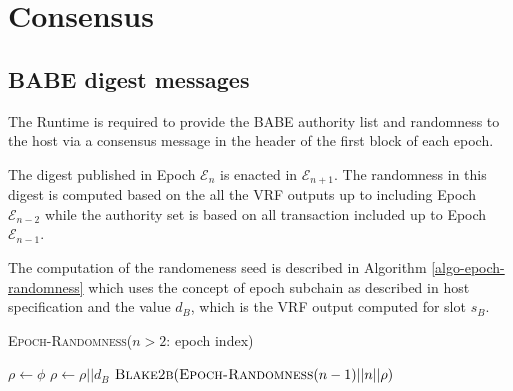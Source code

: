 \chapter{Consensus}

\section{BABE digest messages}

The Runtime is required to provide the BABE authority list and randomness to the host via a consensus message in the header of the first block of each epoch.

The digest published in Epoch $\mathcal{E}_n$ is enacted in $\mathcal{E}_{n+1}$. The randomness in this digest is computed based on the all the VRF outputs up to including Epoch $\mathcal{E}_{n-2}$ while the authority set is based on all transaction included up to Epoch $\mathcal{E}_{n-1}$.

The computation of the randomeness seed is described in Algorithm \ref{algo-epoch-randomness} which uses the concept of epoch subchain as described in host specification and the value $d_B$, which is the VRF output computed for slot $s_B$.

\begin{algorithm}[H]
  \caption{\textsc{Epoch-Randomness}($n>2$: epoch index)}
  \label{algo-epoch-randomness}
  \begin{algorithmic}[1]
    \State \Init $\rho \leftarrow \phi$
      \State $\rho \leftarrow \rho || d_B$
    \EndFor
    \State \Return $\textsc{Blake2b}(\textsc{Epoch-Randomness}(n-1)||n||\rho)$
  \end{algorithmic}
\end{algorithm}

